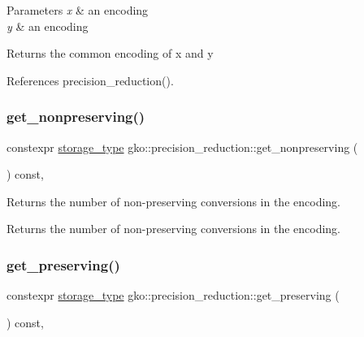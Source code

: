\begin{DoxyParams}{Parameters}
{\em x} & an encoding \\
\hline
{\em y} & an encoding\\
\hline
\end{DoxyParams}
\begin{DoxyReturn}{Returns}
the common encoding of {\ttfamily x} and {\ttfamily y} 
\end{DoxyReturn}


References precision\+\_\+reduction().

\mbox{\label{classgko_1_1precision__reduction_a909a01025fd490d4658abd7c5791685d}} 
\subsubsection{\texorpdfstring{get\+\_\+nonpreserving()}{get\_nonpreserving()}}
{\footnotesize\ttfamily constexpr \hyperlink{classgko_1_1precision__reduction_a2a1a94a27fa69b4cc321136b56e7b7d9}{storage\+\_\+type} gko\+::precision\+\_\+reduction\+::get\+\_\+nonpreserving (\begin{DoxyParamCaption}{ }\end{DoxyParamCaption}) const\hspace{0.3cm}{\ttfamily [inline]}, {\ttfamily [noexcept]}}



Returns the number of non-\/preserving conversions in the encoding. 

\begin{DoxyReturn}{Returns}
the number of non-\/preserving conversions in the encoding. 
\end{DoxyReturn}
\mbox{\label{classgko_1_1precision__reduction_ad709bd9bdd9b4ec27f75fc213aef51df}} 
\subsubsection{\texorpdfstring{get\+\_\+preserving()}{get\_preserving()}}
{\footnotesize\ttfamily constexpr \hyperlink{classgko_1_1precision__reduction_a2a1a94a27fa69b4cc321136b56e7b7d9}{storage\+\_\+type} gko\+::precision\+\_\+reduction\+::get\+\_\+preserving (\begin{DoxyParamCaption}{ }\end{DoxyParamCaption}) const\hspace{0.3cm}{\ttfamily [inline]}, {\ttfamily [noexcept]}}



